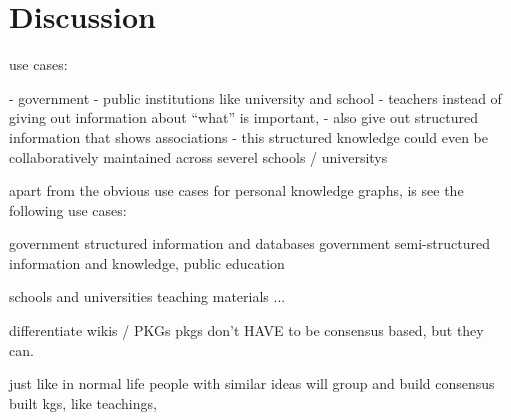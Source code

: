\chapter{Discussion} \label{ch:discussion}

use cases:

- government
- public institutions like university and school
    - teachers instead of giving out information about “what” is important,
    - also give out structured information that shows associations
    - this structured knowledge could even be collaboratively maintained across severel schools / universitys

apart from the obvious use cases for personal knowledge graphs, is see the following use cases:

government structured information and databases
government semi-structured information and knowledge, public education

schools and universities
    teaching materials 
    ...

differentiate wikis / PKGs 
pkgs don’t HAVE to be consensus based, but they can.

just like in normal life people with similar ideas will group and build consensus built kgs, like teachings,